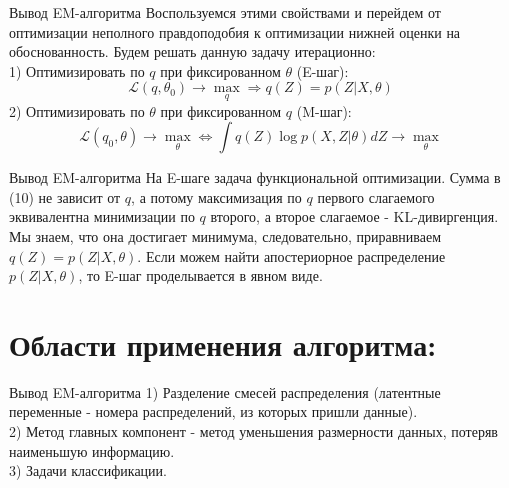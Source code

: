 \documentclass[russian]{vegapresentation}
\begin{document}
	\begin{frame}{Вывод EM-алгоритма}
		Воспользуемся этими свойствами и перейдем от оптимизации неполного правдоподобия к оптимизации нижней оценки на обоснованность. Будем решать данную задачу итерационно: \\
		1) Оптимизировать по $q$ при фиксированном $\theta$ (E-шаг):
		\begin{equation}
			\mathcal{L}(q, \theta_0) \longrightarrow \max_{q} \Rightarrow q(Z) = p(Z|X, \theta)
		\end{equation}
		2) Оптимизировать по $\theta$ при фиксированном $q$ (M-шаг):
		\begin{equation}
			\mathcal{L}(q_0, \theta) \longrightarrow \max_{\theta} \Leftrightarrow \int q(Z) \log p(X, Z| \theta)dZ \longrightarrow \max_{\theta}
		\end{equation}
    	\end{frame}
    	
    	
	\begin{frame}{Вывод EM-алгоритма}
		На E-шаге задача функциональной оптимизации. Сумма в (10) не зависит от $q$, а потому максимизация по $q$ первого слагаемого эквивалентна минимизации по $q$ второго, а второе слагаемое - KL-дивиргенция. Мы знаем, что она достигает минимума, следовательно, приравниваем $q(Z) = p(Z|X, \theta)$. Если можем найти апостериорное распределение $p(Z| X, \theta)$, то E-шаг проделывается в явном виде.
    	\end{frame}
    	
    	\section{Области применения алгоритма:}
    	
    	\begin{frame}{Вывод EM-алгоритма}
		1) Разделение смесей распределения (латентные переменные - номера распределений, из которых пришли данные). \\
		2) Метод главных компонент - метод уменьшения размерности данных, потеряв наименьшую информацию. \\
		3) Задачи классификации.
    	\end{frame}
    	
    	
    
\end{document}
